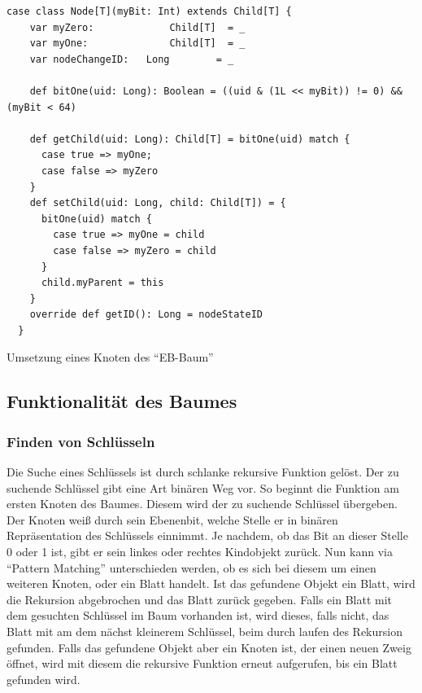 \documentclass[a4paper,11pt,oneside,%
headsepline,												%
footsepline,												%
bibtotocnumbered									%
]{scrreprt}
\begin{document}
\begin{listing}[H]
	\begin{verbatim}
case class Node[T](myBit: Int) extends Child[T] {
    var myZero:				Child[T]  = _
    var myOne:				Child[T]  = _
    var nodeChangeID:	Long    	= _

    def bitOne(uid: Long): Boolean = ((uid & (1L << myBit)) != 0) && (myBit < 64)

    def getChild(uid: Long): Child[T] = bitOne(uid) match {
      case true => myOne;
      case false => myZero
    }
    def setChild(uid: Long, child: Child[T]) = {
      bitOne(uid) match {
        case true => myOne = child
        case false => myZero = child
      }
      child.myParent = this
    }
    override def getID(): Long = nodeStateID
  }	
	\end{verbatim}
	\caption{Umsetzung eines Knoten des \enquote{EB-Baum}}
	\label{lst:Knoten EB-Baum}
\end{listing}

\subsection{Funktionalität des Baumes}
\subsubsection{Finden von Schlüsseln}
\label{sssec:FindKey}
Die Suche eines Schlüssels ist durch schlanke rekursive Funktion gelöst. Der zu suchende Schlüssel gibt eine Art binären Weg vor. So beginnt die Funktion am ersten Knoten des Baumes. Diesem wird der zu suchende Schlüssel übergeben. Der Knoten weiß durch sein Ebenenbit, welche Stelle er in binären Repräsentation des Schlüssels einnimmt. Je nachdem, ob das Bit an dieser Stelle 0 oder 1 ist, gibt er sein linkes oder rechtes Kindobjekt zurück. Nun kann via \enquote{Pattern Matching} unterschieden werden, ob es sich bei diesem um einen weiteren Knoten, oder ein Blatt handelt. Ist das gefundene Objekt ein Blatt, wird die Rekursion abgebrochen und das Blatt zurück gegeben. Falls ein Blatt mit dem gesuchten Schlüssel im Baum vorhanden ist, wird dieses, falls nicht, das Blatt mit am dem nächst kleinerem Schlüssel, beim durch laufen des Rekursion gefunden. Falls das gefundene Objekt aber ein Knoten ist, der einen neuen Zweig öffnet, wird mit diesem die rekursive Funktion erneut aufgerufen, bis ein Blatt gefunden wird.
\end{document}
